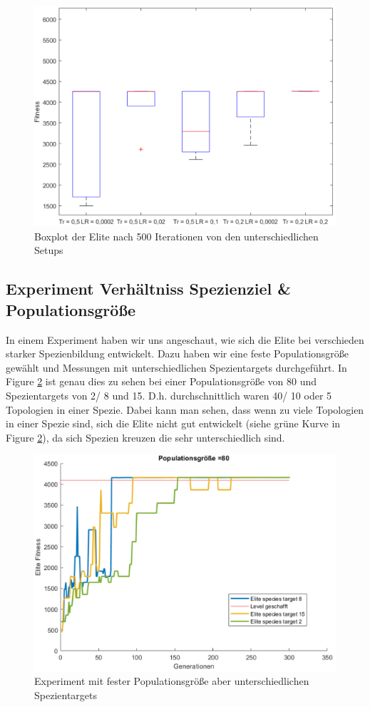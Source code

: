 \documentclass{hbrs-ecta-report}
\begin{document}
\begin{figure}[h!]
	\centering
	\includegraphics[width=\linewidth]{img/Mario_Treshold_boxplot.png}
	\caption{Boxplot der Elite nach 500 Iterationen von den unterschiedlichen Setups}
	\label{fig:treshold_boxplot} 
\end{figure}


\subsection{Experiment Verhältniss Spezienziel \& Populationsgröße}
In einem Experiment haben wir uns angeschaut, wie sich die Elite bei verschieden starker Spezienbildung entwickelt. Dazu haben wir eine feste Populationsgröße gewählt und Messungen mit unterschiedlichen Spezientargets durchgeführt. In Figure \ref{fig:Spezien} ist genau dies zu sehen bei einer Populationsgröße von 80 und Spezientargets von 2/ 8 und 15. D.h. durchschnittlich waren 40/ 10 oder 5 Topologien in einer Spezie. Dabei kann man sehen, dass wenn zu viele Topologien in einer Spezie sind, sich die Elite nicht gut entwickelt (siehe grüne Kurve in Figure \ref{fig:Spezien}), da sich Spezien kreuzen die sehr unterschiedlich sind. \\
\begin{figure}[h!]
\centering
\includegraphics[width=\linewidth]{img/Mario_80_Netze_gesamt.png}
\caption{Experiment mit fester Populationsgröße aber unterschiedlichen Spezientargets}
\label{fig:Spezien} 
\end{figure}
\end{document}
